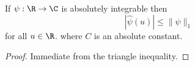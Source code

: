 \begin{lemma}
\label{prelim-decay}
\leanok
If $\psi:\R \to \C$ is absolutely integrable then $$ |\hat \psi(u)| \leq \| \psi \|_1 $$
  for all $u \in \R$. where $C$ is an absolute constant.
\end{lemma}
\begin{proof}
\leanok
Immediate from the triangle inequality.
\end{proof}
